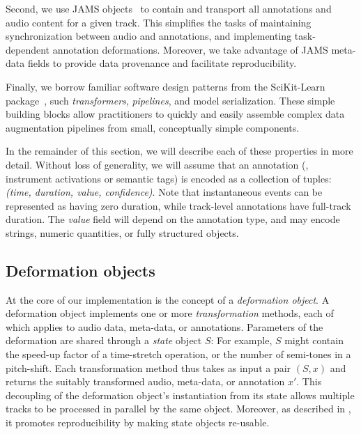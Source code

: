 \documentclass{article}
\begin{document}
Second, we use JAMS objects~\cite{humphreyjams} to contain and transport all
annotations and audio content for a given track.
This simplifies the tasks of maintaining synchronization between audio and annotations,
and implementing task-dependent annotation deformations.  Moreover, we take
advantage of JAMS meta-data fields to provide data provenance and facilitate
reproducibility.

%
Finally, we borrow familiar software design patterns from the SciKit-Learn
package~\cite{buitinck2013api}, such \emph{transformers}, \emph{pipelines}, 
and model serialization.  These simple building blocks allow
practitioners to quickly and easily assemble complex data augmentation pipelines 
from small, conceptually simple components.


In the remainder of this section, we will describe each of these
properties in more detail.  Without loss of generality, we will assume that an
annotation (\eg, instrument activations or semantic tags) is encoded as a collection of
tuples: \emph{(time, duration, value, confidence)}.
Note that instantaneous events can be represented as having zero duration, while
track-level annotations have full-track duration.  The \emph{value} field will depend on
the annotation type, and may encode strings, numeric quantities, or fully structured
objects.

\subsection{Deformation objects}

At the core of our implementation is the concept of a \emph{deformation object}.
A deformation object implements one or more \emph{transformation} methods, each of which
applies to audio data, meta-data, or annotations.
Parameters of the deformation are shared through a \emph{state} object $S$:
For example, $S$ might contain the speed-up factor of a
time-stretch operation, or the number of semi-tones in a pitch-shift.  
Each transformation method thus takes as input a pair $(S, x)$ and
returns the suitably transformed audio, meta-data, or annotation $x'$.
This decoupling of the deformation object's instantiation from
its state allows multiple tracks to be processed in parallel by the same object.
Moreover, as described in , it promotes reproducibility 
by making state objects re-usable.
\end{document}
